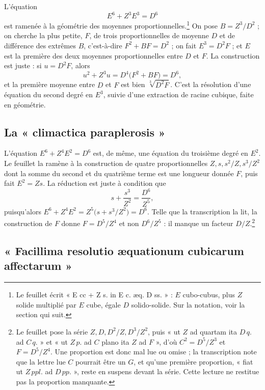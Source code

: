 \documentclass[11pt,a4paper]{article}
\begin{document}
L'équation
\[ E^6 + Z^3 E^3 = D^6 \]
est ramenée à la géométrie des moyennes proportionnelles.\footnote{Le feuillet
écrit « E cc + Z s. in E c. æq. D ss. » : $E$ cubo-cubus, plus $Z$ solide
multiplié par $E$ cube, égale $D$ solido-solide. Sur la notation, voir la
section qui suit.} On pose $B = Z^3/D^2$ ; on cherche la plus petite, $F$, de
trois proportionnelles de moyenne $D$ et de différence des extrêmes $B$,
c'est-à-dire $F^2 + BF = D^2$ ; on fait $E^3 = D^2 F$ ; et $E$ est la première
des deux moyennes proportionnelles entre $D$ et $F$. La construction est
juste : si $u = D^2 F$, alors
\[ u^2 + Z^3 u = D^4\bigl(F^2 + BF\bigr) = D^6 , \]
et la première moyenne entre $D$ et $F$ est bien $\sqrt[3]{D^2F}$. C'est la
résolution d'une équation du second degré en $E^3$, suivie d'une extraction de
racine cubique, faite en géométrie.

\subsection*{La « climactica paraplerosis »}

L'équation $E^6 + Z^4E^2 = D^6$ est, de même, une équation du troisième degré en
$E^2$. Le feuillet la ramène à la construction de quatre proportionnelles
$Z, s, s^2/Z, s^3/Z^2$ dont la somme du second et du quatrième terme est une
longueur donnée $F$, puis fait $E^2 = Zs$. La réduction est juste à condition
que
\[ s + \frac{s^3}{Z^2} = \frac{D^6}{Z^5}, \]
puisqu'alors $E^6 + Z^4E^2 = Z^5\bigl(s + s^3/Z^2\bigr) = D^6$. Telle que la
transcription la lit, la construction de $F$ donne $F = D^5/Z^4$ et non
$D^6/Z^5$ : il manque un facteur $D/Z$.\footnote{Le feuillet pose la série
$Z, D, D^2/Z, D^3/Z^2$, puis « ut $Z$ ad quartam ita $D\,q.$ ad $C\,q.$ » et « ut
$Z\,p.$ ad $C$ plano ita $Z$ ad $F$ », d'où $C^2 = D^5/Z^3$ et $F = D^5/Z^4$. Une
proportion est donc mal lue ou omise ; la transcription note que la lettre lue
$C$ pourrait être un $G$, et qu'une première proportion, « fiat ut $Z\,ppl.$ ad
$D\,pp.$ », reste en suspens devant la série. Cette lecture ne restitue pas la
proportion manquante.}

\subsection*{« Facillima resolutio æquationum cubicarum affectarum »}
\end{document}
